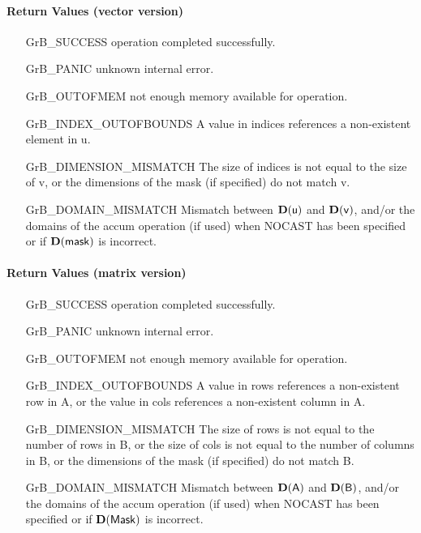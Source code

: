 \paragraph{Return Values (vector version)}

\begin{itemize}[leftmargin=2.1in]
\item[{\sf GrB\_SUCCESS}]     operation completed successfully.
\item[{\sf GrB\_PANIC}]        unknown internal error.
\item[{\sf GrB\_OUTOFMEM}]    not enough memory available for operation.
\item[{\sf GrB\_INDEX\_OUTOFBOUNDS}]
        A value in {\sf indices} references a non-existent element in {\sf u}.
\item[{\sf GrB\_DIMENSION\_MISMATCH}] 
        The size of {\sf indices} is not equal to the size of {\sf v}, or
        the dimensions of the mask (if specified) do not match {\sf v}.
\item[{\sf GrB\_DOMAIN\_MISMATCH}]    Mismatch between $\bold{D}({\sf u})$ and $\bold{D}({\sf v})$, and/or the domains of the 
                                      {\sf accum} operation (if used) when {\sf NOCAST} has
                                      been specified or if $\bold{D}(\sf mask)$ is incorrect.
\end{itemize}

\paragraph{Return Values (matrix version)}


\begin{itemize}[leftmargin=2.1in]
\item[{\sf GrB\_SUCCESS}]     operation completed successfully.
\item[{\sf GrB\_PANIC}]        unknown internal error.
\item[{\sf GrB\_OUTOFMEM}]    not enough memory available for operation.
\item[{\sf GrB\_INDEX\_OUTOFBOUNDS}]
        A value in {\sf rows} references a non-existent row in {\sf A}, or
        the value in {\sf cols} references a non-existent column in {\sf A}.
\item[{\sf GrB\_DIMENSION\_MISMATCH}] 
        The size of {\sf rows} is not equal to the number of rows in {\sf B}, or
        the size of {\sf cols} is not equal to the number of columns in {\sf B}, or
        the dimensions of the mask (if specified) do not match {\sf B}.
\item[{\sf GrB\_DOMAIN\_MISMATCH}]    Mismatch between $\bold{D}({\sf A})$ and $\bold{D}({\sf B})$, and/or the domains of the 
                                      {\sf accum} operation (if used) when {\sf NOCAST} has
                                      been specified or if $\bold{D}(\sf Mask)$ is incorrect.
\end{itemize}


